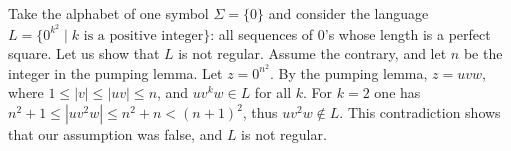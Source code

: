 

\setcounter{section}{3}
\setcounter{subsection}{2}
\setcounter{dfn}{5}

\begin{exl}
Take the alphabet of one symbol $\Sigma = \{0\}$
and consider the language $L = \{0^{k^2} \mid k \text{ is a positive integer}\}$:
all sequences of $0$'s whose length is a perfect square.
Let us show that $L$ is not regular. Assume the contrary, and let $n$ be the integer in the pumping lemma.
Let $z = 0^{n^2}$. By the pumping lemma, $z = uvw$, where $1 \le |v| \le |uv| \le n$, and $uv^kw \in L$ for all $k$.
For $k=2$ one has $n^2+1 \le |uv^2w| \le n^2 + n < (n+1)^2$, thus $uv^2w \notin L$.
This contradiction shows that our assumption was false, and $L$ is not regular.
\end{exl}

